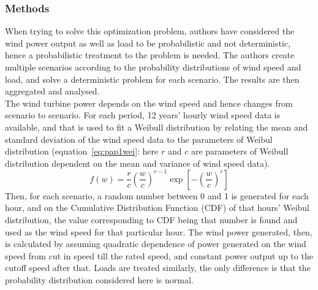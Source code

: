 \subsubsection{Methods}
When trying to solve this optimization problem, authors have considered the wind power output as well as load to be probabilistic and not deterministic, hence a probabilistic treatment to the problem is needed. The authors create multiple scenarios according to the probability distributions of wind speed and load, and solve a deterministic problem for each scenario. The results are then aggregated and analysed.\\
The wind turbine power depends on the wind speed and hence changes from scenario to scenario. For each period, 12 years' hourly wind speed data is available, and that is used to fit a Weibull distribution by relating the mean and standard deviation of the wind speed data to the parameters of Weibul distribution (equation~\eqref{eq:pap1wei}: here $r$ and $c$ are parameters of Weibull distribution dependent on the mean and variance of wind speed data).
\begin{equation}
\label{eq:pap1wei}
f(w) = \frac{r}{c}\left(\frac{w}{c}\right)^{r-1}\exp\left[-\left(\frac{w}{c}\right)^r\right]
\end{equation}
Then, for each scenario, a random number between 0 and 1 is generated for each hour, and on the Cumulative Distribution Function (CDF) of that hours' Weibul distribution, the value corresponding to CDF being that number is found and used as the wind speed for that particular hour. The wind power generated, then, is calculated by assuming quadratic dependence of power generated on the wind speed from cut in speed till the rated speed, and constant power output up to the cutoff speed after that. Loads are treated similarly, the only difference is that the probability distribution considered here is normal.\\
